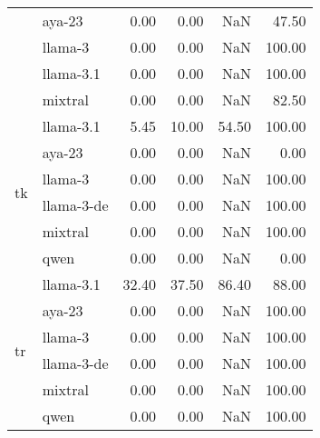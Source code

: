 \begin{tabular}{llrrrr}
 & aya-23 & 0.00 & 0.00 & NaN & 47.50 \\
 & llama-3 & 0.00 & 0.00 & NaN & 100.00 \\
 & llama-3.1 & 0.00 & 0.00 & NaN & 100.00 \\
 & mixtral & 0.00 & 0.00 & NaN & 82.50 \\
\cline{1-6}
\multirow[t]{6}{*}{tk} & llama-3.1 & 5.45 & 10.00 & 54.50 & 100.00 \\
 & aya-23 & 0.00 & 0.00 & NaN & 0.00 \\
 & llama-3 & 0.00 & 0.00 & NaN & 100.00 \\
 & llama-3-de & 0.00 & 0.00 & NaN & 100.00 \\
 & mixtral & 0.00 & 0.00 & NaN & 100.00 \\
 & qwen & 0.00 & 0.00 & NaN & 0.00 \\
\cline{1-6}
\multirow[t]{6}{*}{tr} & llama-3.1 & 32.40 & 37.50 & 86.40 & 88.00 \\
 & aya-23 & 0.00 & 0.00 & NaN & 100.00 \\
 & llama-3 & 0.00 & 0.00 & NaN & 100.00 \\
 & llama-3-de & 0.00 & 0.00 & NaN & 100.00 \\
 & mixtral & 0.00 & 0.00 & NaN & 100.00 \\
 & qwen & 0.00 & 0.00 & NaN & 100.00 \\
\cline{1-6}
\bottomrule
\end{tabular}
